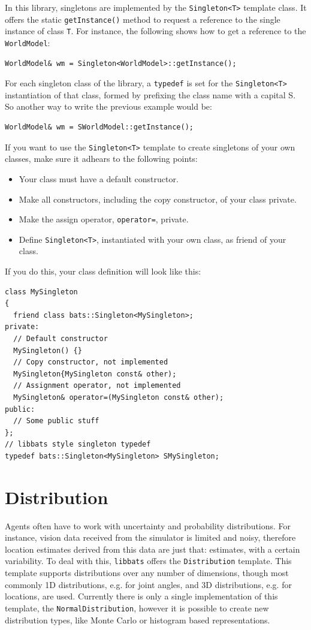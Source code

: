 In this library, singletons are implemented by the {\tt Singleton<T>} template class. It offers the static {\tt getInstance()} method to request a reference to the single instance of class {\tt T}. For instance, the following shows how to get a reference to the {\tt WorldModel}:
\begin{lstlisting}[frame=single]
WorldModel& wm = Singleton<WorldModel>::getInstance();
\end{lstlisting}
For each singleton class of the library, a {\tt typedef} is set for the {\tt Singleton<T>} instantiation of that class, formed by prefixing the class name with a capital S. So another way to write the previous example would be:
\begin{lstlisting}[frame=single]
WorldModel& wm = SWorldModel::getInstance();
\end{lstlisting}

If you want to use the {\tt Singleton<T>} template to create singletons of your own classes, make sure it adhears to the following points:
\begin{itemize}
\item Your class must have a default constructor.
\item Make all constructors, including the copy constructor, of your class private. 
\item Make the assign operator, {\tt operator=}, private.
\item Define {\tt Singleton<T>}, instantiated with your own class, as friend of your class.
\end{itemize}
If you do this, your class definition will look like this:
\begin{lstlisting}[frame=single]
class MySingleton
{
  friend class bats::Singleton<MySingleton>;
private:
  // Default constructor
  MySingleton() {}
  // Copy constructor, not implemented
  MySingleton{MySingleton const& other);
  // Assignment operator, not implemented
  MySingleton& operator=(MySingleton const& other);
public:
  // Some public stuff
};
// libbats style singleton typedef
typedef bats::Singleton<MySingleton> SMySingleton;
\end{lstlisting}

\section{Distribution}

Agents often have to work with uncertainty and probability distributions. For instance, vision data received from the simulator is limited and noisy, therefore location estimates derived from this data are just that: estimates, with a certain variability. To deal with this, {\tt libbats} offers the {\tt Distribution} template. This template supports distributions over any number of dimensions, though most commonly 1D distributions, e.g. for joint angles, and 3D distributions, e.g. for locations, are used. Currently there is only a single implementation of this template, the {\tt NormalDistribution}, however it is possible to create new distribution types, like Monte Carlo or histogram based representations.

